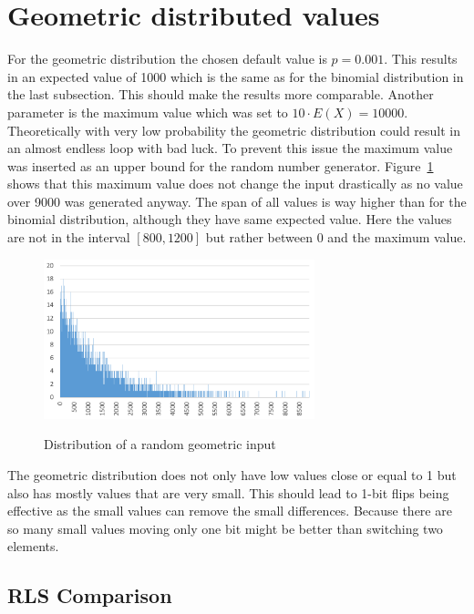 \section{Geometric distributed values}
For the geometric distribution the chosen default value is $p=0.001$.
This results in an expected value of 1000 which is the same as for the binomial distribution in the last subsection.
This should make the results more comparable.
Another parameter is the maximum value which was set to $10 \cdot E(X)=10000$.
Theoretically with very low probability the geometric distribution could result in an almost endless loop with bad luck.
To prevent this issue the maximum value was inserted as an upper bound for the random number generator. 
Figure~\ref{fig:geoDistExample} shows that this maximum value does not change the input drastically as no value over 9000 was generated anyway.
The span of all values is way higher than for the binomial distribution, although they have same expected value.
Here the values are not in the interval $[800,1200]$ but rather between 0 and the maximum value. 

\begin{figure}[h]
      \caption{Distribution of a random geometric input}
      \centering
      \includegraphics[width=0.7\textwidth]{figures/images/numberGenerator/geometricDistributionForp0_001.png}\label{fig:geoDistExample}
\end{figure}

The geometric distribution does not only have low values close or equal to 1 but also has mostly values that are very small.
This should lead to 1-bit flips being effective as the small values can remove the small differences. Because there are so many small values moving only one bit might be better than switching two elements.  
\subsection{RLS Comparison}


